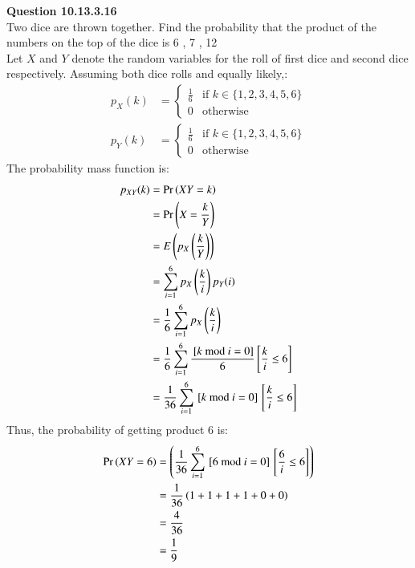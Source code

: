 \documentclass[journal,12pt,onecolumn]{IEEEtran}
\begin{document}
\vspace{3cm}
\title{}
\author{EE22BTECH11049 - Shivansh Kirar}
\maketitle
\textbf{Question 10.13.3.16}\\
Two dice are thrown together. Find the probability that the product of the numbers on the top of the dice is 6 , 7 , 12 \\
\solution
\fi
Let $X$ and $Y$ denote the random variables for the roll of first dice and second dice respectively.
Assuming both dice rolls and equally likely,:
\begin{align}
        p_X(k) &= 
        \begin{cases}
            \frac{1}{6} & \text{if }k \in \{1, 2, 3, 4, 5, 6\}\\
            0 & \text{otherwise}
        \end{cases}\label{eq:10.13.3.16.a}\\
        p_Y(k) &=
        \begin{cases}
            \frac{1}{6} & \text{if }k \in \{1, 2, 3, 4, 5, 6\}\\
            0 & \text{otherwise}
        \end{cases}
\end{align}
The probability mass function is:
\begin{align}
        p_{XY}(k) &= \Pr\left(XY = k\right)\\
        &= \Pr\left(X = \frac{k}{Y}\right)\\
        &= E\left(p_X\left(\frac{k}{Y}\right)\right)\\
        &= \sum_{i = 1}^{6} p_X\left(\frac{k}{i}\right) p_Y(i)\\
        &= \frac{1}{6} \sum_{i = 1}^{6} p_X\left(\frac{k}{i}\right)\\
        &= \frac{1}{6} \sum_{i = 1}^{6} \frac{{}\left[k \text{ mod } i = 0\right]}{6}{}\left[\frac{k}{i} \leq 6\right]\\
        &= \frac{1}{36} \sum_{i = 1}^{6} {}\left[k \text{ mod } i = 0\right]{}\left[\frac{k}{i} \leq 6\right]
\end{align}
Thus, the probability of getting product 6 is:
\begin{align}
    \Pr\left(XY = 6\right) &= \left(\frac{1}{36}\sum_{i = 1}^{6} {}\left[6 \text{ mod } i = 0\right]{}\left[\frac{6}{i} \leq 6\right]\right) \\
    &= \frac{1}{36} \left( 1 + 1 + 1 + 1 + 0 + 0  \right) \\
    &= \frac{4}{36} \\
    &= \frac{1}{9} 
\end{align}
\end{document}
